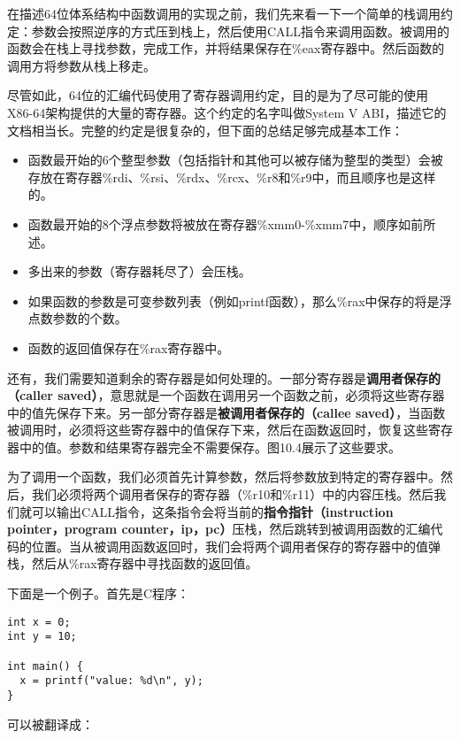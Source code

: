 \documentclass[cn,11pt,chinese]{elegantbook}
\begin{document}
在描述64位体系结构中函数调用的实现之前，我们先来看一下一个简单的栈调用约定：参数会按照逆序的方式压到栈上，然后使用CALL指令来调用函数。被调用的函数会在栈上寻找参数，完成工作，并将结果保存在\%eax寄存器中。然后函数的调用方将参数从栈上移走。

尽管如此，64位的汇编代码使用了寄存器调用约定，目的是为了尽可能的使用X86-64架构提供的大量的寄存器。这个约定的名字叫做System V ABI，描述它的文档相当长。完整的约定是很复杂的，但下面的总结足够完成基本工作：

\begin{itemize}
  \item 函数最开始的6个整型参数（包括指针和其他可以被存储为整型的类型）会被存放在寄存器\%rdi、\%rsi、\%rdx、\%rcx、\%r8和\%r9中，而且顺序也是这样的。
  \item 函数最开始的8个浮点参数将被放在寄存器\%xmm0-\%xmm7中，顺序如前所述。
  \item 多出来的参数（寄存器耗尽了）会压栈。
  \item 如果函数的参数是可变参数列表（例如printf函数），那么\%rax中保存的将是浮点数参数的个数。
  \item 函数的返回值保存在\%rax寄存器中。
\end{itemize}

还有，我们需要知道剩余的寄存器是如何处理的。一部分寄存器是\textbf{调用者保存的（caller saved）}，意思就是一个函数在调用另一个函数之前，必须将这些寄存器中的值先保存下来。另一部分寄存器是\textbf{被调用者保存的（callee saved）}，当函数被调用时，必须将这些寄存器中的值保存下来，然后在函数返回时，恢复这些寄存器中的值。参数和结果寄存器完全不需要保存。图10.4展示了这些要求。

为了调用一个函数，我们必须首先计算参数，然后将参数放到特定的寄存器中。然后，我们必须将两个调用者保存的寄存器（\%r10和\%r11）中的内容压栈。然后我们就可以输出CALL指令，这条指令会将当前的\textbf{指令指针（instruction pointer，program counter，ip，pc）}压栈，然后跳转到被调用函数的汇编代码的位置。当从被调用函数返回时，我们会将两个调用者保存的寄存器中的值弹栈，然后从\%rax寄存器中寻找函数的返回值。

下面是一个例子。首先是C程序：

\begin{verbatim}
int x = 0;
int y = 10;

int main() {
  x = printf("value: %d\n", y);
}
\end{verbatim}

可以被翻译成：
\end{document}

